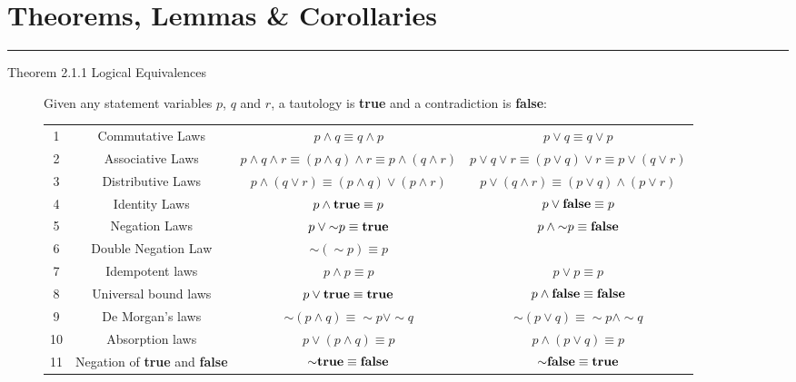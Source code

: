 \documentclass{article}
\begin{document}

\newpage
\section*{Theorems, Lemmas \& Corollaries}
\hrule
\vspace{0.3cm}
\begin{description}

    \item[Theorem 2.1.1 Logical Equivalences]Given any statement variables $p$, $q$ and $r$, a tautology is \textbf{true} and a contradiction is \textbf{false}: 
    \begin{table}[h]
        \centering
        {
        \begin{tabular}{|c|c|c|c|}
            \hline
             1 & Commutative Laws & $p \wedge q\equiv q\wedge p$ & $p \vee q\equiv q\vee p$ \\
             2 & Associative Laws & $p\wedge q\wedge r\equiv (p\wedge q)\wedge r\equiv p\wedge(q\wedge r)$ & $p\vee q\vee r\equiv (p\vee q)\vee r\equiv p\vee(q\vee r)$ \\
             3 & Distributive Laws & $p\wedge (q\vee r)\equiv(p\wedge q)\vee(p\wedge r)$ & $p\vee (q\wedge r)\equiv(p\vee q)\wedge(p\vee r)$ \\ 
             4 & Identity Laws & $p\wedge\text{\textbf{true}}\equiv p$ & $p\vee\text{\textbf{false}}\equiv p$ \\
             5 & Negation Laws & $p\vee{\sim} p\equiv\text{\textbf{true}}$ & $p\wedge{\sim} p\equiv\text{\textbf{false}}$ \\
             6 & Double Negation Law & ${\sim}({\sim} p)\equiv p$ &  \\
             7 & Idempotent laws & $p\wedge p\equiv p$ & $p\vee p\equiv p$ \\
             8 & Universal bound laws & $p\vee\text{\textbf{true}}\equiv\text{\textbf{true}}$ & $p\wedge\text{\textbf{false}}\equiv\text{\textbf{false}}$ \\
             9 & De Morgan's laws & ${\sim}(p\wedge q)\equiv{\sim} p\vee{\sim} q$ & ${\sim}(p\vee q)\equiv{\sim} p\wedge{\sim} q$ \\
             10 & Absorption laws & $p\vee(p\wedge q)\equiv p$ & $p\wedge(p\vee q)\equiv p$ \\
             11 & Negation of \textbf{true} and \textbf{false} & ${\sim}\text{\textbf{true}}\equiv\text{\textbf{false}}$ & ${\sim}\text{\textbf{false}}\equiv\text{\textbf{true}}$ \\

\end{tabular}}
\end{table}
\end{description}
\end{document}
